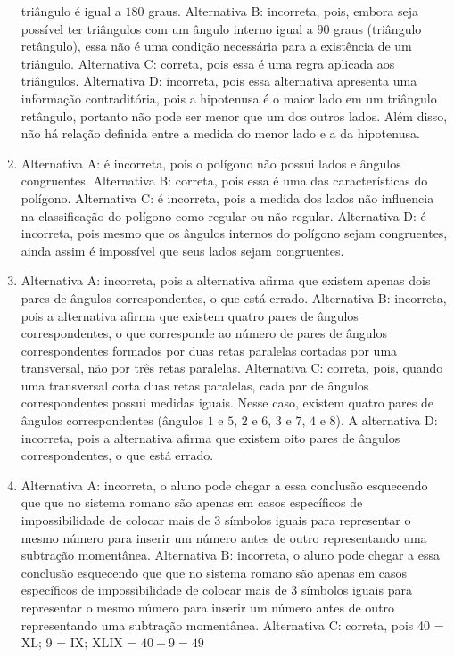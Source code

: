 \begin{enumerate}
triângulo é igual a $180$ graus.
Alternativa B: incorreta, pois, embora seja possível ter triângulos com
um ângulo interno igual a $90$ graus (triângulo retângulo), essa não é uma
condição necessária para a existência de um triângulo.
Alternativa C: correta, pois essa é uma regra aplicada aos triângulos.
Alternativa D: incorreta, pois essa alternativa apresenta uma informação
contraditória, pois a hipotenusa é o maior lado em um triângulo
retângulo, portanto não pode ser menor que um dos outros lados. Além
disso, não há relação definida entre a medida do menor lado e a da
hipotenusa.
\item Alternativa A: é incorreta, pois o polígono não possui lados e ângulos
congruentes. Alternativa B: correta, pois essa é uma das características
do polígono. Alternativa C: é incorreta, pois a medida dos lados não
influencia na classificação do polígono como regular ou não regular.
Alternativa D: é incorreta, pois mesmo que os ângulos internos do
polígono sejam congruentes, ainda assim é impossível que seus lados
sejam congruentes.
\item Alternativa A: incorreta, pois a alternativa afirma que existem apenas
dois pares de ângulos correspondentes, o que está errado. Alternativa B:
incorreta, pois a alternativa afirma que existem quatro pares de ângulos
correspondentes, o que corresponde ao número de pares de ângulos
correspondentes formados por duas retas paralelas cortadas por uma
transversal, não por três retas paralelas. Alternativa C: correta, pois,
quando uma transversal corta duas retas paralelas, cada par de ângulos
correspondentes possui medidas iguais. Nesse caso, existem quatro pares
de ângulos correspondentes (ângulos $1$ e $5$, $2$ e $6$, $3$ e $7$, $4$ e $8$). A
alternativa D: incorreta, pois a alternativa afirma que existem oito
pares de ângulos correspondentes, o que está errado.
\item Alternativa A: incorreta, o aluno pode chegar a essa conclusão
esquecendo que que no sistema romano são apenas em casos específicos de
impossibilidade de colocar mais de $3$ símbolos iguais para representar o
mesmo número para inserir um número antes de outro representando uma
subtração momentânea.
Alternativa B: incorreta, o aluno pode chegar a essa conclusão
esquecendo que que no sistema romano são apenas em casos específicos de
impossibilidade de colocar mais de $3$ símbolos iguais para representar o
mesmo número para inserir um número antes de outro representando uma
subtração momentânea.
Alternativa C: correta, pois 40 = XL; 9 = IX; XLIX = $40 + 9 = 49$

\end{enumerate}

